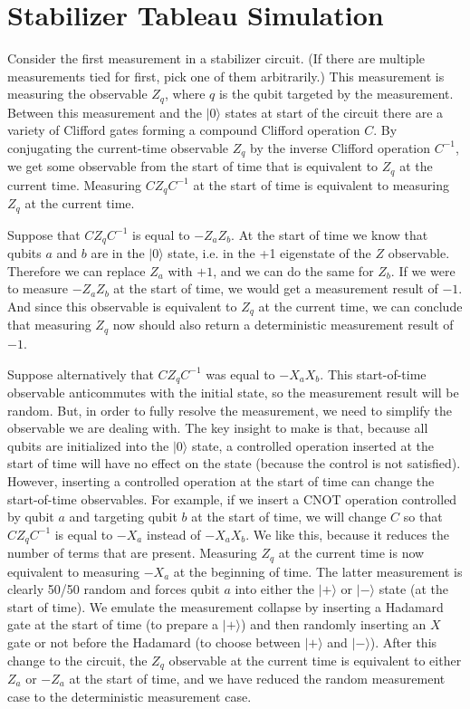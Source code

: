 \documentclass[onecolumn,unpublished]{quantumarticle}
\theoremstyle{definition}
\theoremstyle{definition}
\theoremstyle{definition}
\begin{document}
\section{Stabilizer Tableau Simulation}
\label{sec:tableausim}

Consider the first measurement in a stabilizer circuit.
(If there are multiple measurements tied for first, pick one of them arbitrarily.)
This measurement is measuring the observable $Z_q$, where $q$ is the qubit targeted by the measurement.
Between this measurement and the $|0\rangle$ states at start of the circuit there are a variety of Clifford gates forming a compound Clifford operation $C$.
By conjugating the current-time observable $Z_q$ by the inverse Clifford operation $C^{-1}$, we get some observable from the start of time that is equivalent to $Z_q$ at the current time.
Measuring $C Z_q C^{-1}$ at the start of time is equivalent to measuring $Z_q$ at the current time.

Suppose that $C Z_q C^{-1}$ is equal to $-Z_a Z_b$.
At the start of time we know that qubits $a$ and $b$ are in the $|0\rangle$ state, i.e. in the +1 eigenstate of the $Z$ observable.
Therefore we can replace $Z_a$ with $+1$, and we can do the same for $Z_b$.
If we were to measure $-Z_a Z_b$ at the start of time, we would get a measurement result of $-1$.
And since this observable is equivalent to $Z_q$ at the current time, we can conclude that measuring $Z_q$ now should also return a deterministic measurement result of $-1$.

Suppose alternatively that $C Z_q C^{-1}$ was equal to $-X_a X_b$.
This start-of-time  observable anticommutes with the initial state, so the measurement result will be random.
But, in order to fully resolve the measurement, we need to simplify the observable we are dealing with.
The key insight to make is that, because all qubits are initialized into the $|0\rangle$ state, a controlled operation inserted at the start of time will have no effect on the state (because the control is not satisfied).
However, inserting a controlled operation at the start of time can change the start-of-time observables.
For example, if we insert a CNOT operation controlled by qubit $a$ and targeting qubit $b$ at the start of time, we will change $C$ so that $C Z_q C^{-1}$ is equal to $-X_a$ instead of $-X_a X_b$.
We like this, because it reduces the number of terms that are present.
Measuring $Z_q$ at the current time is now equivalent to measuring $-X_a$ at the beginning of time.
The latter measurement is clearly 50/50 random and forces qubit $a$ into either the $|+\rangle$ or $|-\rangle$ state (at the start of time).
We emulate the measurement collapse by inserting a Hadamard gate at the start of time (to prepare a $|+\rangle$) and then randomly inserting an $X$ gate or not before the Hadamard (to choose between $|+\rangle$ and $|-\rangle$).
After this change to the circuit, the $Z_q$ observable at the current time is equivalent to either $Z_a$ or $-Z_a$ at the start of time, and we have reduced the random measurement case to the deterministic measurement case.
\end{document}

